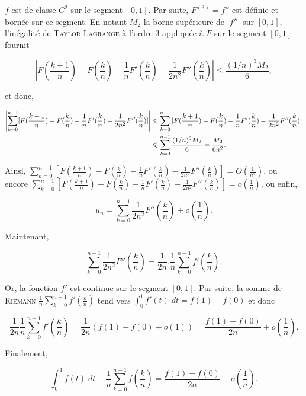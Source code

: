 \documentclass[11pt,a4paper]{article}
\begin{document}
$f$ est de classe $C^2$ sur le segment $[0,1]$. Par suite, $F^{(3)}=f''$ est définie et bornée sur ce segment. En notant $M_2$ la borne supérieure de $|f''|$ sur $[0,1]$, l'inégalité de \textsc{Taylor}-\textsc{Lagrange} à l'ordre 3 appliquée à $F$ sur le segment $[0,1]$ fournit

$$\left|F(\frac{k+1}{n})-F(\frac{k}{n})-\frac{1}{n}F'(\frac{k}{n})-\frac{1}{2n^2}F''(\frac{k}{n})\right|
\leq\frac{(1/n)^3M_2}{6},$$

et donc,
 
\begin{align*}\ensuremath
\left|\sum_{k=0}^{n-1}[F(\frac{k+1}{n})-F(\frac{k}{n})-\frac{1}{n}F'(\frac{k}{n})-\frac{1}{2n^2}F''(\frac{k}{n})]
\right|&\leq\sum_{k=0}^{n-1}|F(\frac{k+1}{n})-F(\frac{k}{n})-\frac{1}{n}F'(\frac{k}{n})-\frac{1}{2n^2}F''(\frac{k}{n})|\\
 &\leq\sum_{k=0}^{n-1}\frac{(1/n)^3M_2}{6}=\frac{M_2}{6n^2}.
\end{align*}

Ainsi, $\sum_{k=0}^{n-1}[F(\frac{k+1}{n})-F(\frac{k}{n})-\frac{1}{n}F'(\frac{k}{n})-\frac{1}{2n^2}F''(\frac{k}{n})]=O(\frac{1}{n^2})$, ou encore $\sum_{k=0}^{n-1}[F(\frac{k+1}{n})-F(\frac{k}{n})-\frac{1}{n}F'(\frac{k}{n})-\frac{1}{2n^2}F''(\frac{k}{n})]=o(\frac{1}{n})$, ou enfin,

$$u_n=\sum_{k=0}^{n-1}\frac{1}{2n^2}F''(\frac{k}{n})+o(\frac{1}{n}).$$

Maintenant, 

$$\sum_{k=0}^{n-1}\frac{1}{2n^2}F''(\frac{k}{n})=\frac{1}{2n}.\frac{1}{n}\sum_{k=0}^{n-1}f'(\frac{k}{n}).$$

Or, la fonction $f'$ est continue sur le segment $[0,1]$. Par suite, la somme de \textsc{Riemann} $\frac{1}{n}\sum_{k=0}^{n-1}f'(\frac{k}{n})$ tend vers $\int_{0}^{1}f'(t)\;dt=f(1)-f(0)$ et donc 

$$\frac{1}{2n}\frac{1}{n}\sum_{k=0}^{n-1}f'(\frac{k}{n})=\frac{1}{2n}(f(1)-f(0)+o(1))=\frac{f(1)-f(0)}{2n}+o(\frac{1}{n}).$$

Finalement,

$$\int_{0}^{1}f(t)\;dt-\frac{1}{n}\sum_{k=0}^{n-1}f(\frac{k}{n})=\frac{f(1)-f(0)}{2n}+o(\frac{1}{n}).$$
\end{document}
